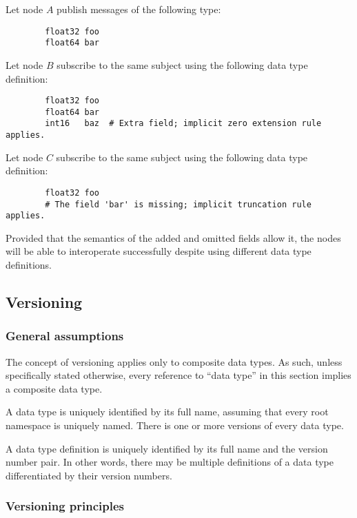 \begin{remark}
    Let node $A$ publish messages of the following type:

    \begin{verbatim}
        float32 foo
        float64 bar
    \end{verbatim}

    Let node $B$ subscribe to the same subject using the following data type definition:

    \begin{verbatim}
        float32 foo
        float64 bar
        int16   baz  # Extra field; implicit zero extension rule applies.
    \end{verbatim}

    Let node $C$ subscribe to the same subject using the following data type definition:

    \begin{verbatim}
        float32 foo
        # The field 'bar' is missing; implicit truncation rule applies.
    \end{verbatim}

    Provided that the semantics of the added and omitted fields allow it,
    the nodes will be able to interoperate successfully despite using different data type definitions.
\end{remark}

\subsection{Versioning}

\subsubsection{General assumptions}

The concept of versioning applies only to composite data types.
As such, unless specifically stated otherwise, every reference to ``data type''
in this section implies a composite data type.

A data type is uniquely identified by its full name,
assuming that every root namespace is uniquely named.
There is one or more versions of every data type.

A data type definition is uniquely identified by its full name and the version number pair.
In other words, there may be multiple definitions of a data type differentiated by their version numbers.

\subsubsection{Versioning principles}

